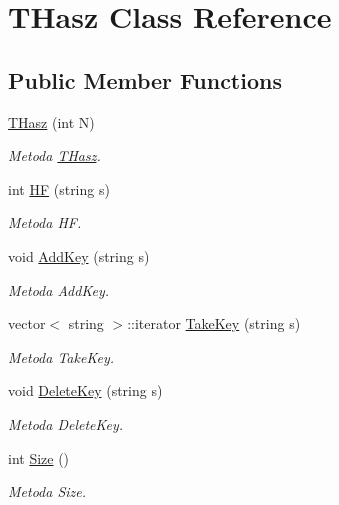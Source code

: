 \hypertarget{class_t_hasz}{\section{T\-Hasz Class Reference}
\label{class_t_hasz}
}
\subsection*{Public Member Functions}
\begin{DoxyCompactItemize}
\item 
\hyperlink{class_t_hasz_a1e6d468eb9b2ada8c3592ffcb651b7f2}{T\-Hasz} (int N)
\begin{DoxyCompactList}\small\item\em Metoda \hyperlink{class_t_hasz}{T\-Hasz}. \end{DoxyCompactList}\item 
int \hyperlink{class_t_hasz_ad594c669104d97334d28378aca4dcac1}{H\-F} (string s)
\begin{DoxyCompactList}\small\item\em Metoda H\-F. \end{DoxyCompactList}\item 
void \hyperlink{class_t_hasz_a307a75cee976bb3664616b79690391a3}{Add\-Key} (string s)
\begin{DoxyCompactList}\small\item\em Metoda Add\-Key. \end{DoxyCompactList}\item 
vector$<$ string $>$\-::iterator \hyperlink{class_t_hasz_af4d8909f450ddcc38977c642152425c6}{Take\-Key} (string s)
\begin{DoxyCompactList}\small\item\em Metoda Take\-Key. \end{DoxyCompactList}\item 
void \hyperlink{class_t_hasz_a5e10a42a6d770454e33e49d0ef3ee2cd}{Delete\-Key} (string s)
\begin{DoxyCompactList}\small\item\em Metoda Delete\-Key. \end{DoxyCompactList}\item 
int \hyperlink{class_t_hasz_a2a69afe2cd91a24df1db4d1ebe541a2a}{Size} ()
\begin{DoxyCompactList}\small\item\em Metoda Size. \end{DoxyCompactList}\end{DoxyCompactItemize}


